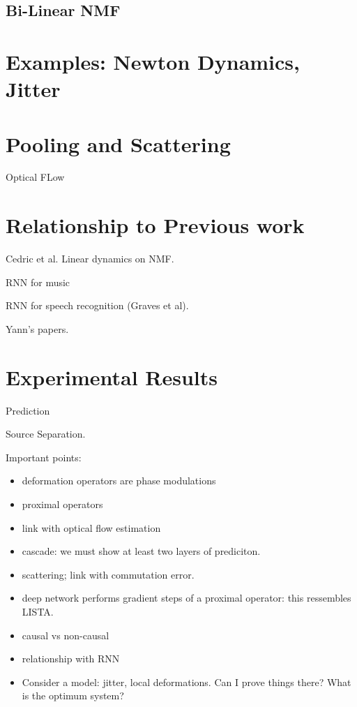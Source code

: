 \documentclass[11pt]{article} %
\begin{document}
\subsection{Bi-Linear NMF}

\section{Examples: Newton Dynamics, Jitter}

\section{Pooling and Scattering}

Optical FLow

\section{Relationship to Previous work}

Cedric et al. Linear dynamics on NMF. 

RNN for music

RNN for speech recognition (Graves et al). 

Yann's papers.

\section{Experimental Results}

Prediction

Source Separation.





Important points:

\begin{itemize}
\item deformation operators are phase modulations 
\item proximal operators
\item link with optical flow estimation
\item cascade: we must show at least two layers of prediciton.
\item scattering; link with commutation error.
\item deep network performs gradient steps of a proximal operator: this ressembles LISTA.
\item causal vs non-causal
\item relationship with RNN
\item Consider a model: jitter, local deformations. Can I prove things there? What is the optimum system?
\end{itemize}
\end{document}
